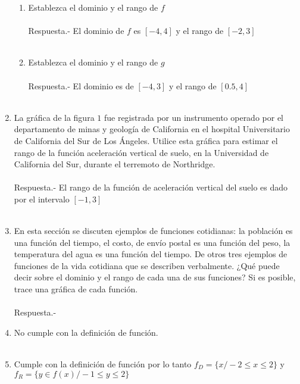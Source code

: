 \begin{enumerate}
\begin{enumerate}[\bfseries (a)]
	    \item Establezca el dominio y el rango de $f$\\\\
		Respuesta.-\; El dominio de $f$ es $[-4,4]$ y el rango de $[-2,3]$\\\\

	    \item Establezca el dominio y el rango de $g$\\\\
		Respuesta.-\; El dominio es de $[-4,3]$ y el rango de $[0.5,4]$\\\\

	\end{enumerate}

    \item La gráfica de la figura $1$ fue registrada por un instrumento operado por el departamento de minas y geología de California en el hospital Universitario de California del Sur de Los Ángeles. Utilice esta gráfica para estimar el rango de la función aceleración vertical de suelo, en la Universidad de California del Sur, durante el terremoto de Northridge.\\\\
	Respuesta.-\; El rango de la función de aceleración  vertical del suelo es dado por el intervalo $[-1,3]$\\\\ 

    \item En esta sección se discuten ejemplos de funciones cotidianas: la población es una función del tiempo, el costo, de envío postal es una función del peso, la temperatura del agua es una función del tiempo. De otros tres ejemplos de funciones de la vida cotidiana que se describen verbalmente. ¿Qué puede decir sobre el dominio y el rango de cada una de sus funciones? Si es posible, trace una gráfica de cada función.\\\\
	Respuesta.-\; 

    \item No cumple con la definición de función.\\\\

    \item Cumple con la definición de función por lo tanto $f_D=\lbrace x / -2 \leq x \leq 2 \rbrace$ y $f_R=\lbrace y \in f(x) / -1 \leq y \leq 2 \rbrace$\\\\


\end{enumerate}
